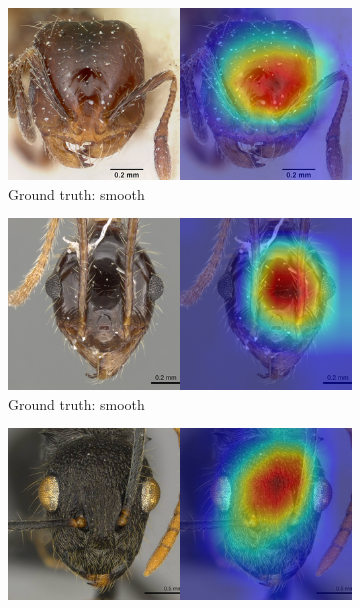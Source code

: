 \documentclass{aci}
\numberwithin{equation}{section}
\begin{document}
\newcommand{\subwidth}{0.35\textwidth}
\begin{figure}
    \centering
    \begin{subfigure}{\subwidth}
        \includegraphics[width=1\linewidth]{thesis_assets/gradcam/correct_ideal/518.png}
        \caption{Ground truth: smooth}
        \label{fig:correct_ideal_518}
    \end{subfigure}
    \begin{subfigure}{\subwidth}
        \includegraphics[width=1\linewidth]{thesis_assets/gradcam/correct_ideal/808.png}
        \caption{Ground truth: smooth}
        \label{fig:correct_ideal_808}
    \end{subfigure}
    \begin{subfigure}{\subwidth}
        \includegraphics[width=1\linewidth]{thesis_assets/gradcam/correct_ideal/842.png}

\end{subfigure}
\end{figure}
\end{document}
